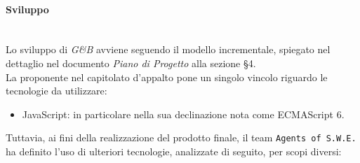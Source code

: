 \paragraph{Sviluppo} \-\\
\label{Progettazione_Sviluppo}
Lo sviluppo di \textit{G\&B} avviene seguendo il modello incrementale, spiegato nel dettaglio nel documento \textit{Piano di Progetto} alla sezione §4.\\
La proponente nel capitolato d'appalto pone un singolo vincolo riguardo le tecnologie da utilizzare:
\begin{itemize}
	\item JavaScript: in particolare nella sua declinazione nota come ECMAScript 6\glossario.
\end{itemize}
Tuttavia, ai fini della realizzazione del prodotto finale, il team \texttt{Agents of S.W.E.} ha definito l'uso di ulteriori tecnologie, analizzate di seguito, per scopi diversi:
